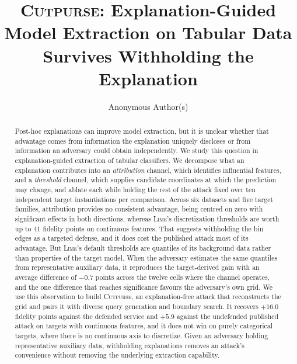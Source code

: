 \documentclass[sigconf,anonymous,review]{acmart}
\newcommand{\sys}{\textsc{Cutpurse}}
\begin{document}
\title[\sys]{\sys: Explanation-Guided Model Extraction on Tabular Data
Survives Withholding the Explanation}

\author{Anonymous Author(s)}
\email{}
\renewcommand{\shortauthors}{Anonymous}

\begin{abstract}
Post-hoc explanations can improve model extraction, but it is unclear whether that advantage comes
from information the explanation uniquely discloses or from information an adversary could obtain
independently. We study this question in explanation-guided extraction of tabular classifiers. We
decompose what an explanation contributes into an \emph{attribution} channel, which identifies
influential features, and a \emph{threshold} channel, which supplies candidate coordinates at which
the prediction may change, and ablate each while holding the rest of the attack fixed over ten
independent target instantiations per comparison. Across six datasets and five target families,
attribution provides no consistent advantage, being centred on zero with significant effects in both
directions, whereas \textsc{Lime}'s discretization thresholds are worth up to $41$ fidelity points on
continuous features. That suggests withholding the bin edges as a targeted defense, and it does cost
the published attack most of its advantage. But \textsc{Lime}'s default thresholds are quantiles of
its background data rather than properties of the target model. When the adversary estimates the same
quantiles from representative auxiliary data, it reproduces the target-derived gain with an average
difference of $-0.7$ points across the twelve cells where the channel operates, and the one
difference that reaches significance favours the adversary's own grid. We
use this observation to build \sys, an explanation-free attack that reconstructs the grid and pairs
it with diverse query generation and boundary search. It recovers $+16.0$ fidelity points against the
defended service and $+5.9$ against the undefended published attack on targets with continuous
features, and it does not win on purely categorical targets, where there is no continuous axis to
discretize. Given an adversary holding representative auxiliary data, withholding explanations
removes an attack's convenience without removing the underlying extraction capability.
\end{abstract}
\end{document}
